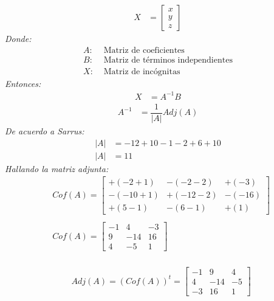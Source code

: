 \documentclass[11pt, a4paper]{article}
\begin{document}
\begin{multicols}{2}
\begin{align*}
    X &= \begin{bmatrix}
      x\\
      y\\
      z
    \end{bmatrix}
  \end{align*}
  \textit{Donde:}
  \begin{align*}
    A: &\text{ Matriz de coeficientes}\\
    B: &\text{ Matriz de términos independientes}\\
    X: &\text{ Matriz de incógnitas}
  \end{align*}
  \textit{Entonces:}
  \begin{align*}
    X &= A^{-1}B
  \end{align*}
  \begin{align*}
    A^{-1} &= \dfrac{1}{|A|}Adj\left(A\right)
  \end{align*}
  \textit{De acuerdo a Sarrus:}
  \begin{align*}
    |A| &= -12+10-1-2+6+10\\
    |A| &= 11
  \end{align*}
  \textit{Hallando la matriz adjunta:}
  \begin{align*}
    &Cof\left(A\right) = \begin{bmatrix}
      +\left(-2+1\right) & -\left(-2-2\right) & +\left(-3\right)\\
      -\left(-10+1\right) & +\left(-12-2\right) & -\left(-16\right)\\
      +\left(5-1\right) & -\left(6-1\right) & +\left(1\right)
    \end{bmatrix}\\\\
    &Cof\left(A\right) = \begin{bmatrix}
      -1 & 4 & -3\\
      9 & -14 & 16\\
      4 & -5 & 1
    \end{bmatrix}
  \end{align*}
  \columnbreak\\
  \columnseprule=1pt 
  \vspace{-1cm}
  \begin{align*}
    &Adj\left(A\right) = \left(Cof\left(A\right)\right)^t = \begin{bmatrix}
      -1 & 9 & 4\\
      4 & -14 & -5\\
      -3 & 16 & 1
    \end{bmatrix}

\end{align*}
\end{multicols}
\end{document}
